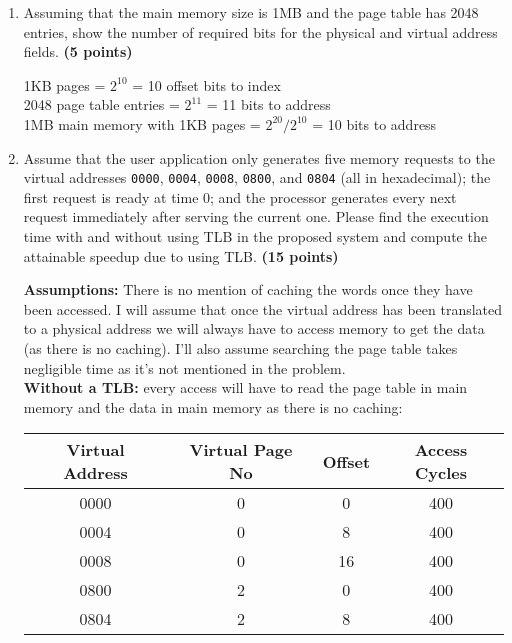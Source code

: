 \documentclass[a4paper, 11pt]{exam}
\begin{document}
\begin{enumerate}
\begin{enumerate}
	\item Assuming that the main memory size is 1MB and the page table has 2048 entries, show the number of required bits for the physical and virtual address fields. \textbf{(5 points)}
	
	1KB pages = $2^{10}$ = 10 offset bits to index \\
	2048 page table entries = $2^{11}$ =  11 bits to address \\
	1MB main memory with 1KB pages = $2^{20} / 2^{10}$ = 10 bits to address
	
	\item Assume that the user application only generates five memory requests to the virtual addresses \texttt{0000}, \texttt{0004}, \texttt{0008}, \texttt{0800}, and \texttt{0804} (all in hexadecimal);
	the first request is ready at time 0; and
	the processor generates every next request immediately after serving the current one.
	Please find the execution time with and without using TLB in the proposed system and compute the attainable speedup due to using TLB.
	\textbf{(15 points)}
	
	\textbf{Assumptions:} There is no mention of caching the words once they have been accessed. I will assume that once the virtual address has been translated to a physical address we will always have to access memory to get the data (as there is no caching). I'll also assume searching the page table takes negligible time as it's not mentioned in the problem. \\
	
	\textbf{Without a TLB:} every access will have to read the page table in main memory and the data in main memory as there is no caching: \\
	
	\begin{center}
	\begin{tabular}{ |c|c|c|c| } 
		\hline
		\textbf{Virtual Address}& \textbf{Virtual Page No} & \textbf{Offset} & \textbf{Access Cycles} \\ 
		\hline
		0000 & 0 & 0 & 400\\ \hline
		0004 & 0 & 8 & 400 \\ \hline
		0008 & 0 & 16 & 400 \\ \hline
		0800 & 2 & 0 & 400\\ \hline
		0804 & 2& 8 & 400 \\ \hline
	\end{tabular}
	\end{center}
	

\end{enumerate}
\end{enumerate}
\end{document}
